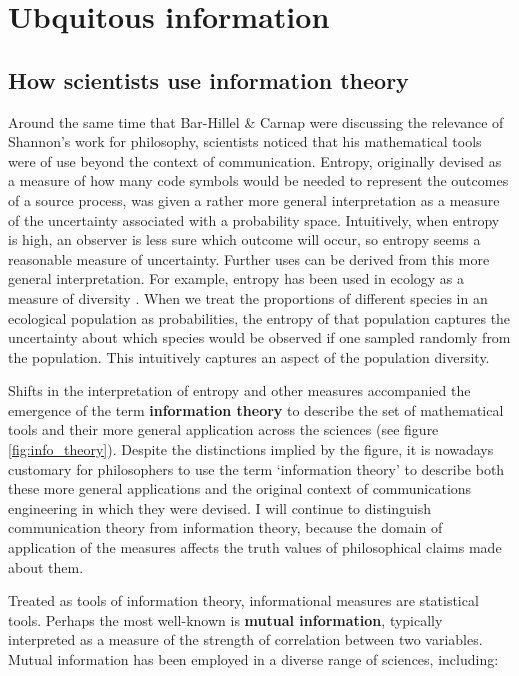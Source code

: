 \section{Ubquitous information}\label{sec:ubiquitous}

\subsection{How scientists use information theory}\label{subsec:scientists}

Around the same time that Bar-Hillel \& Carnap were discussing the relevance of Shannon's work for philosophy, scientists noticed that his mathematical tools were of use beyond the context of communication.
Entropy, originally devised as a measure of how many code symbols would be needed to represent the outcomes of a source process, was given a rather more general interpretation as a measure of the uncertainty associated with a probability space.
Intuitively, when entropy is high, an observer is less sure which outcome will occur, so entropy seems a reasonable measure of uncertainty.
Further uses can be derived from this more general interpretation.
For example, entropy has been used in ecology as a measure of diversity \citep{margalef1957information}.
When we treat the proportions of different species in an ecological population as probabilities, the entropy of that population captures the uncertainty about which species would be observed if one sampled randomly from the population.
This intuitively captures an aspect of the population diversity.

Shifts in the interpretation of entropy and other measures accompanied the emergence of the term \textbf{information theory} to describe the set of mathematical tools and their more general application across the sciences (see figure \ref{fig:info_theory}).
Despite the distinctions implied by the figure, it is nowadays customary for philosophers to use the term `information theory' to describe both these more general applications and the original context of communications engineering in which they were devised.
I will continue to distinguish communication theory from information theory, because the domain of application of the measures affects the truth values of philosophical claims made about them.



Treated as tools of information theory, informational measures are statistical tools.
Perhaps the most well-known is \textbf{mutual information}, typically interpreted as a measure of the strength of correlation between two variables.
Mutual information has been employed in a diverse range of sciences, including:

